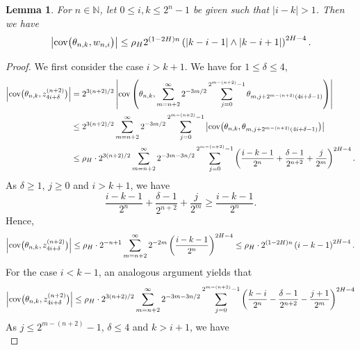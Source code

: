 \documentclass[12pt,reqno]{article}
\numberwithin{equation}{section}
\def\cov{\mbox{cov}}
\def\var{\mbox{var}}
\newtheorem{lemma}[theorem]{Lemma}
\theoremstyle{definition}
\def\cov{\hbox{\rm cov}}\def\var{\text{\rm Var}}
\newcommand{\bN}{\mathbb{N}}
\begin{document}
\begin{lemma}
	For $n \in \bN$, let $0 \le i,k\le 2^n-1$ be given such that $|i-k| > 1$. Then we have 
	\begin{equation}\label{eq Faber w bound}
		\big|\cov\big(\theta_{n,k},w_{n,i}\big)\big| \le \rho_H 2^{(1-2H)n}\left(\left|{k-i-1}\right| \wedge \left|{k-i+1}\right|\right)^{2H-4}.
	\end{equation}
\end{lemma}
\begin{proof}
	We first consider the case $i > k + 1$. We have for $1 \le \delta \le 4$, 
	\begin{equation*}
		\begin{split}
			\left|\cov\big(\theta_{n,k}, z^{(n+2)}_{4i+\delta}\big)\right|&= 2^{3(n+2)/2}\left|\cov\left(\theta_{n,k},\sum_{m = n+2}^\infty 2^{-3m/2}\sum_{j = 0}^{2^{m - (n+2)}-1} \theta_{m,j+2^{m-(n+2)}(4i+\delta-1)}\right)\right| \\
			&\le 2^{3(n+2)/2}\sum_{m = n+2}^\infty 2^{-3m/2}\sum_{j = 0}^{2^{m - (n+2)}-1} \left|\cov\big(\theta_{n,k},\theta_{m,j+2^{m-(n+2)}(4i+\delta-1)}\big)\right| \\
			& \le \rho_H \cdot 2^{3(n+2)/2}\sum_{m = n+2}^\infty 2^{-3m-3n/2}\sum_{j = 0}^{2^{m - (n+2)}-1}\left(\frac{i-k-1}{2^n} + \frac{\delta -1}{2^{n+2}} + \frac{j}{2^m}\right)^{2H-4}.
	\end{split}
	\end{equation*}
	As $\delta \ge 1$, $j \ge 0$ and $i > k+1$,  we have 
	\begin{equation*}
		\frac{i-k-1}{2^n} + \frac{\delta -1}{2^{n+2}} + \frac{j}{2^m} \ge \frac{i-k-1}{2^n}.
	\end{equation*}
	Hence, 
	\begin{equation*}
			\left|\cov\big(\theta_{n,k}, z^{(n+2)}_{4i+\delta}\big)\right|  \le \rho_H\cdot 2^{-n+1}\sum_{m = n+2}^\infty 2^{-2m}\left(\frac{i-k-1}{2^{n}}\right)^{2H-4}  \le \rho_H \cdot 2^{(1-2H)n}\left(i - k -1\right)^{2H-4}.
	\end{equation*}
	For the case $i < k -1$, an analogous argument yields that 
	\begin{equation*}
		\left|\cov\big(\theta_{n,k}, z^{(n+2)}_{4i+\delta}\big)\right| \le \rho_H \cdot 2^{3(n+2)/2}\sum_{m = n+2}^\infty 2^{-3m-3n/2}\sum_{j = 0}^{2^{m - (n+2)}-1}\left(\frac{k-i}{2^n} - \frac{\delta -1}{2^{n+2}} - \frac{j+1}{2^m}\right)^{2H-4}
	\end{equation*}
	As $j \le 2^{m-(n+2)} - 1$, $\delta \le 4$ and $k > i + 1$, we have 
	\begin{equation*}

\end{equation*}
\end{proof}
\end{document}
